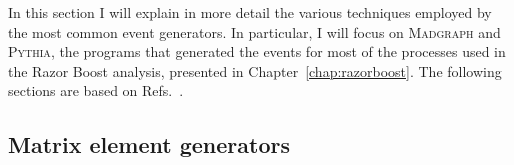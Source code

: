 

In this section I will explain in more detail the various techniques employed by the most common
event generators. In particular, I will focus on \textsc{Madgraph} and \textsc{Pythia}, the programs
that generated the events for most of the processes used in the Razor Boost analysis, presented in
Chapter~\ref{chap:razorboost}. 
The following sections are based on Refs.~\cite{Campbell:2006wx,Salam:2010zt,Buckley:2011ms}. 

\subsection{Matrix element generators \label{sec:event_matrix_element_generators}}




